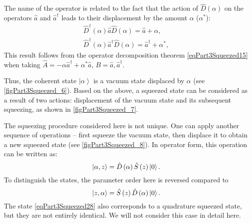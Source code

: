 The name of the operator is related to the fact that the action of
$\hat{D}\left(\alpha\right)$ on the operators $\hat{a}$ and $\hat{a}^{\dag}$
leads to their displacement by the amount $\alpha$ ($\alpha^{*}$):
\begin{eqnarray}
\hat{D}^{\dag}\left(\alpha\right)\hat{a}\hat{D}\left(\alpha\right) =
\hat{a} + \alpha,
\nonumber \\
\hat{D}^{\dag}\left(\alpha\right)\hat{a}^{\dag}\hat{D}\left(\alpha\right) =
\hat{a}^{\dag} + \alpha^{*},
\label{eqPart3SqueezedTaskOffset}
\end{eqnarray}
This result follows from the operator decomposition theorem
\eqref{eqPart3Squeezed15} when taking $\hat{A} = - \alpha \hat{a}^{\dag}
+ \alpha^{*} \hat{a}$, $B=\hat{a}, \hat{a}^{\dag}$.



Thus, the coherent state $\left|\alpha\right>$ is
a vacuum state displaced by $\alpha$
(see \autoref{figPart3Squeezed_6}).
Based on the above, a squeezed
state can be considered as a result of two actions: displacement of the vacuum state and
its subsequent squeezing, as shown in
\autoref{figPart3Squeezed_7}. 




The squeezing procedure considered here is not unique. One can
apply another sequence of operations – first squeeze the vacuum
state, then displace it to obtain a new squeezed state
(see \autoref{figPart3Squeezed_8}). In operator form, this operation can be written as:
\begin{equation}
\left|\alpha, z\right> =
\hat{D}\left(\alpha\right)\hat{S}\left(z\right) \ket{0}.
\label{eqPart3Squeezed28}
\end{equation}
To distinguish the states, the parameter order here is reversed compared to 
\[
\left|z,\alpha\right> =
\hat{S}\left(z\right) \hat{D}\left(\alpha\right)\ket{0}.
\]
The state \eqref{eqPart3Squeezed28} also corresponds to a quadrature squeezed state, but they are not entirely identical.
We will not consider this case in detail here.



